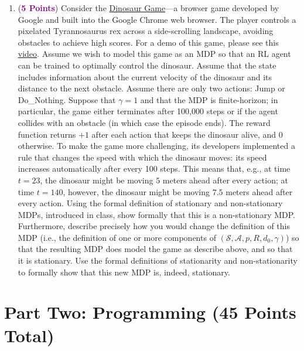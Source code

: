 \documentclass{article}
\newcommand{\POINTS}[1]{\textcolor{purple}{\textbf{{#1}}}}
\begin{document}
\begin{enumerate}
    \item (\POINTS{5 Points}) Consider the \href{https://en.wikipedia.org/wiki/Dinosaur\_Game}{Dinosaur Game}---a browser game developed by Google and built into the Google Chrome web browser. The player controls a pixelated Tyrannosaurus rex across a side-scrolling landscape, avoiding obstacles to achieve  high scores. For a demo of this game, please see this \href{https://www.youtube.com/watch?v=2apVwq-pX9E}{video}. Assume we wish to model this game as an MDP so that an RL agent can be trained to optimally control the dinosaur. Assume that the state includes information about the current velocity of the dinosaur and its distance to the next obstacle. Assume there are only two actions: Jump or Do\_Nothing. Suppose that $\gamma=1$ and that the MDP is finite-horizon; in particular, the game either terminates after 100,000 steps or if the agent collides with an obstacle (in which case the episode ends). The reward function returns $+1$ after each action that keeps the dinosaur alive, and $0$ otherwise. To make the game more challenging, its developers implemented a rule that changes the speed with which the dinosaur moves: its speed increases automatically after every 100 steps. This means that, e.g., at time $t=23$, the dinosaur might be moving $5$ meters ahead after every action; at time $t=140$, however, the dinosaur might be moving $7.5$ meters ahead after every action. Using the formal definition of stationary and non-stationary MDPs, introduced in class, show formally that this is a non-stationary MDP. Furthermore, describe precisely how you would change the definition of this MDP (i.e., the definition of one or more components of $(\mathcal S, \mathcal A, p, R, d_0, \gamma)$) so that the resulting MDP does model the game as describe above, and so that it is stationary. Use the formal definitions of stationarity and non-stationarity to formally show that this new MDP is, indeed, stationary.
\end{enumerate}

\newpage
\section*{Part Two: Programming (45 Points Total)}
\end{document}
